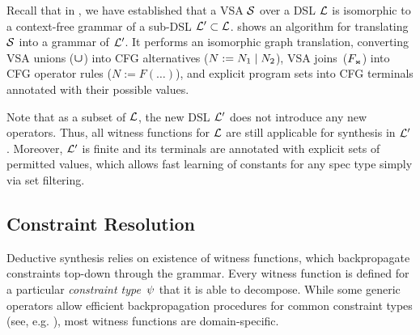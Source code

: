 Recall that in , we have established that a VSA $\mathcal{S}$ over a DSL $\mathcal{L}$ is isomorphic to a
context-free grammar of a sub-DSL $\mathcal{L}' \subset \mathcal{L}$.
 shows an algorithm for translating $\mathcal{S}$ into a grammar of $\mathcal{L}'$.
It performs an isomorphic graph translation, converting VSA unions ($\bm{\mathsf{\cup}}$) into CFG alternatives ($N := N_1 \;|\;
N_2$), VSA joins~($F_{\text{\tiny\ensuremath{\Join}}}$) into CFG operator rules ($N := F(\dots)$), and explicit program sets into CFG terminals
annotated with their possible values.

Note that as a subset of $\mathcal{L}$, the new DSL $\mathcal{L}'$ does not introduce any new operators.
Thus, all witness functions for $\mathcal{L}$ are still applicable for synthesis in $\mathcal{L}'$.
Moreover, $\mathcal{L}'$ is finite and its terminals are annotated with explicit sets of permitted values, which allows fast learning of constants
for any spec type simply via set filtering.

\subsection{Constraint Resolution}
Deductive synthesis relies on existence of witness functions, which backpropagate constraints top-down through the
grammar.
Every witness function is defined for a particular \emph{constraint type}~$\psi$ that it is able to decompose.
While some generic operators allow efficient backpropagation procedures for common constraint types (see, e.g.
\cite{pldi15:swarat,flashextract}), most witness functions are domain-specific.

